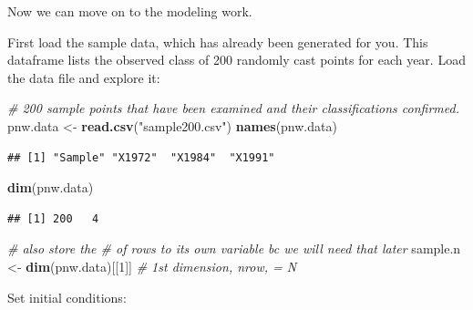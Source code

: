 \documentclass[
]{article}
\newenvironment{Shaded}{\begin{snugshade}}{\end{snugshade}}
\newcommand{\CommentTok}[1]{\textcolor[rgb]{0.56,0.35,0.01}{\textit{#1}}}
\newcommand{\DecValTok}[1]{\textcolor[rgb]{0.00,0.00,0.81}{#1}}
\newcommand{\FunctionTok}[1]{\textcolor[rgb]{0.13,0.29,0.53}{\textbf{#1}}}
\newcommand{\NormalTok}[1]{#1}
\newcommand{\OtherTok}[1]{\textcolor[rgb]{0.56,0.35,0.01}{#1}}
\newcommand{\SpecialCharTok}[1]{\textcolor[rgb]{0.81,0.36,0.00}{\textbf{#1}}}
\newcommand{\StringTok}[1]{\textcolor[rgb]{0.31,0.60,0.02}{#1}}
\begin{document}
Now we can move on to the modeling work.

First load the sample data, which has already been generated for you.
This dataframe lists the observed class of 200 randomly cast points for
each year. Load the data file and explore it:

\begin{Shaded}
\begin{Highlighting}[]
\CommentTok{\# 200 sample points that have been examined and their classifications confirmed.}
\NormalTok{pnw.data }\OtherTok{\textless{}{-}} \FunctionTok{read.csv}\NormalTok{(}\StringTok{"sample200.csv"}\NormalTok{)  }
\FunctionTok{names}\NormalTok{(pnw.data)}
\end{Highlighting}
\end{Shaded}

\begin{verbatim}
## [1] "Sample" "X1972"  "X1984"  "X1991"
\end{verbatim}

\begin{Shaded}
\begin{Highlighting}[]
\FunctionTok{dim}\NormalTok{(pnw.data)}
\end{Highlighting}
\end{Shaded}

\begin{verbatim}
## [1] 200   4
\end{verbatim}

\begin{Shaded}
\begin{Highlighting}[]
  \CommentTok{\# also store the \# of rows to it\textquotesingle{}s own variable bc we will need that later}
\NormalTok{sample.n }\OtherTok{\textless{}{-}} \FunctionTok{dim}\NormalTok{(pnw.data)[[}\DecValTok{1}\NormalTok{]] }\CommentTok{\# 1st dimension, nrow, = N   }
\end{Highlighting}
\end{Shaded}

Set initial conditions:

\begin{Shaded}
\end{Shaded}
\end{document}
